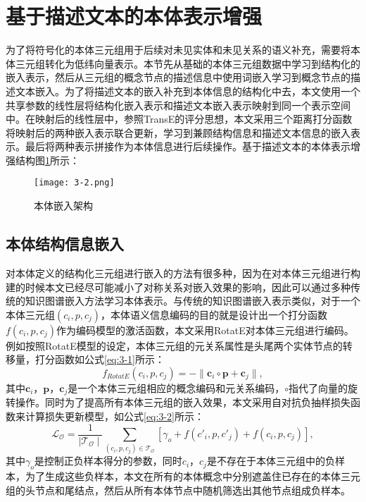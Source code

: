 \section{基于描述文本的本体表示增强}
为了将符号化的本体三元组用于后续对未见实体和未见关系的语义补充，需要将本体三元组转化为低纬向量表示。本节先从基础的本体三元组数据中学习到结构化的嵌入表示，然后从三元组的概念节点的描述信息中使用词嵌入学习到概念节点的描述文本嵌入。为了将描述文本的嵌入补充到本体信息的结构化中去，本文使用一个共享参数的线性层将结构化嵌入表示和描述文本嵌入表示映射到同一个表示空间中。在映射后的线性层中，参照TransE的评分思想，本文采用三个距离打分函数将映射后的两种嵌入表示联合更新，学习到兼顾结构信息和描述文本信息的嵌入表示。最后将两种表示拼接作为本体信息进行后续操作。基于描述文本的本体表示增强结构图\ref{fig:3-6}所示：
\begin{figure}[h]
  \centering
  \texttt{[image: 3-2.png]}
  \caption{本体嵌入架构}
  \label{fig:3-6}
\end{figure}

\subsection{本体结构信息嵌入}
对本体定义的结构化三元组进行嵌入的方法有很多种，因为在对本体三元组进行构建的时候本文已经尽可能减小了对称关系对嵌入效果的影响，因此可以通过多种传统的知识图谱嵌入方法学习本体表示。与传统的知识图谱嵌入表示类似，对于一个本体三元组\((c_{i},p,c_{j})\)，本体语义信息编码的目的就是设计出一个打分函数\(f(c_{i},p,c_{j})\)作为编码模型的激活函数，本文采用RotatE对本体三元组进行编码。例如按照RotatE模型的设定，本体三元组的元关系属性是头尾两个实体节点的转移量，打分函数如公式\ref{eq:3-1}所示：
\begin{equation}
  f_{RotatE}(c_{i},p,c_{j}) = - \| \textbf{c}_{i} \circ \textbf{p} + \textbf{c}_{j}\|, \label{eq:3-1}
\end{equation}
其中\(\textbf{c}_{i}\)，\(\textbf{p}\)，\(\textbf{c}_{j}\)是一个本体三元组相应的概念编码和元关系编码，\(\circ\)指代了向量的旋转操作。同时为了提高所有本体三元组的嵌入效果，本文采用自对抗负抽样损失函数来计算损失更新模型，如公式\ref{eq:3-2}所示：
\begin{equation}
  \mathcal{L}_{\mathcal{O}} = \frac{1}{\mid \mathcal{T}_{\mathcal{O}}\mid} \sum_{(c_{i},p,c_{j}) \in \mathcal{T}_{\mathcal{O}}} [\gamma _{o} + f(c'_{i},p,c'_{j}) + f(c_{i},p,c_{j})], \label{eq:3-2}
\end{equation}
其中\(\gamma _{o}\)是控制正负样本得分的参数，同时\(c_{i}\)，\(c_{j}\)是不存在于本体三元组中的负样本，为了生成这些负样本，本文在所有的本体概念中分别遮盖住已存在的本体三元组的头节点和尾结点，然后从所有本体节点中随机筛选出其他节点组成负样本。

